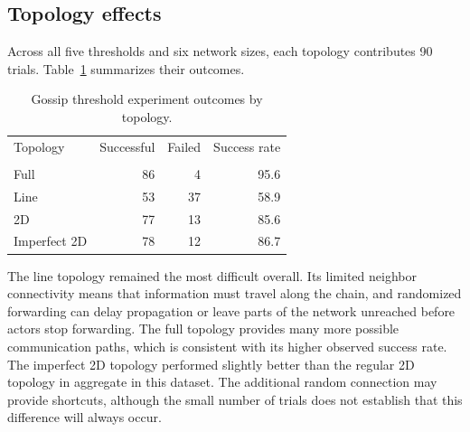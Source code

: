 \documentclass[11pt]{article}
\begin{document}
\subsection{Topology effects}
Across all five thresholds and six network sizes, each topology
contributes 90 trials. Table~\ref{tab:topology-threshold} summarizes
their outcomes.
\par
\begin{table}[H]
\centering
\caption{Gossip threshold experiment outcomes by topology.}
\label{tab:topology-threshold}
\begin{tabular}{lrrr}
\toprule
Topology & Successful & Failed & Success rate \\\\
\midrule
Full & 86 & 4 & 95.6\\%
Line & 53 & 37 & 58.9\\%
2D & 77 & 13 & 85.6\\%
Imperfect 2D & 78 & 12 & 86.7\\%
\bottomrule
\end{tabular}
\end{table}
The line topology remained the most difficult overall. Its limited
neighbor connectivity means that information must travel along the
chain, and randomized forwarding can delay propagation or leave
parts of the network unreached before actors stop forwarding.
The full topology provides many more possible communication paths,
which is consistent with its higher observed success rate.
The imperfect 2D topology performed slightly better than the
regular 2D topology in aggregate in this dataset. The additional
random connection may provide shortcuts, although the small number
of trials does not establish that this difference will always occur.
\par
\end{document}
